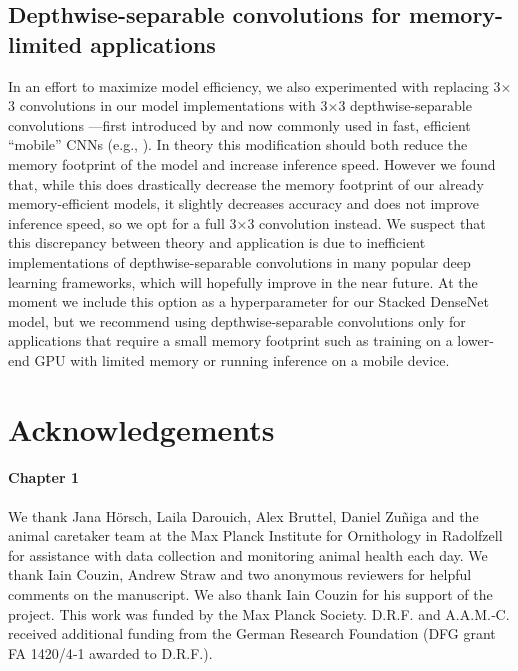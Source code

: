 \documentclass[11pt,a4paper,oneside]{article}
\begin{document}
\begin{appendices}
\subsection{Depthwise-separable convolutions for memory-limited applications}
In an effort to maximize model efficiency, we also experimented with replacing 3$\times$3 convolutions in our model implementations with 3$\times$3 depthwise-separable convolutions —first introduced by \cite{chollet2017xception} and now commonly used in fast, efficient “mobile” CNNs (e.g., \citealt{sandler2018mobilenetv2}). In theory this modification should both reduce the memory footprint of the model and increase inference speed. However we found that, while this does drastically decrease the memory footprint of our already memory-efficient models, it slightly decreases accuracy and does not improve inference speed, so we opt for a full 3$\times$3 convolution instead. We suspect that this discrepancy between theory and application is due to inefficient implementations of depthwise-separable convolutions in many popular deep learning frameworks, which will hopefully improve in the near future. At the moment we include this option as a hyperparameter for our Stacked DenseNet model, but we recommend using depthwise-separable convolutions only for applications that require a small memory footprint such as training on a lower-end GPU with limited memory or running inference on a mobile device.



\end{appendices}

\pagebreak
\nocite{*}



\section{Acknowledgements}

\paragraph{Chapter 1}
We thank Jana Hörsch, Laila Darouich, Alex Bruttel, Daniel Zuñiga and the animal caretaker team at the Max Planck Institute for Ornithology in Radolfzell for assistance with data collection and monitoring animal health each day. We thank Iain Couzin, Andrew Straw and two anonymous reviewers for helpful comments on the manuscript. We also thank Iain Couzin for his support of the project. This work was funded by the Max Planck Society. D.R.F. and A.A.M.‐C. received additional funding from the German Research Foundation (DFG grant FA 1420/4‐1 awarded to D.R.F.).
\end{document}
